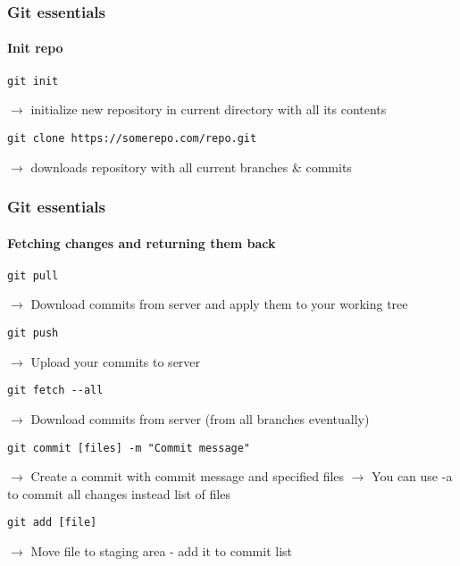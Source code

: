 \documentclass{beamer}
\begin{document}
    \begin{frame}[fragile]
        \frametitle{Git essentials}
        \framesubtitle{Init repo}
        \begin{lstlisting}[gobble=12]
            git init
        \end{lstlisting}
        $\rightarrow$ initialize new repository in current directory with all its contents
        \begin{lstlisting}[gobble=12]
            git clone https://somerepo.com/repo.git
        \end{lstlisting}
        $\rightarrow$ downloads repository with all current branches \& commits
    \end{frame}
    \begin{frame}[fragile]
        \frametitle{Git essentials}
        \framesubtitle{Fetching changes and returning them back}
        \begin{lstlisting}[gobble=12]
            git pull
        \end{lstlisting}
        $\rightarrow$ Download commits from server and apply them to your working tree
        \begin{lstlisting}[gobble=12]
            git push
        \end{lstlisting}
        $\rightarrow$ Upload your commits to server
        \begin{lstlisting}[gobble=12]
            git fetch --all
        \end{lstlisting}
        $\rightarrow$ Download commits from server (from all branches eventually)
        \begin{lstlisting}[gobble=12]
            git commit [files] -m "Commit message"
        \end{lstlisting}
        $\rightarrow$ Create a commit with commit message and specified files\newline
        $\rightarrow$ You can use -a to commit all changes instead list of files
        \begin{lstlisting}[gobble=12]
            git add [file]
        \end{lstlisting}
        $\rightarrow$ Move file to staging area - add it to commit list
    \end{frame}
\end{document}
